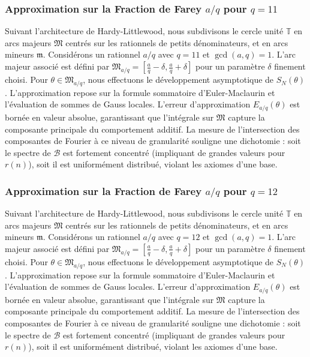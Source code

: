 \documentclass[11pt,a4paper]{article}
\begin{document}
\subsubsection{Approximation sur la Fraction de Farey $a/q$ pour $q=11$}
Suivant l'architecture de Hardy-Littlewood, nous subdivisons le cercle unité $\mathbb{T}$ en arcs majeurs $\mathfrak{M}$ centrés sur les rationnels de petits dénominateurs, et en arcs mineurs $\mathfrak{m}$.
Considérons un rationnel $a/q$ avec $q = 11$ et $\gcd(a,q)=1$. L'arc majeur associé est défini par $\mathfrak{M}_{a/q} = [\frac{a}{q} - \delta, \frac{a}{q} + \delta]$ pour un paramètre $\delta$ finement choisi.
Pour $\theta \in \mathfrak{M}_{a/q}$, nous effectuons le développement asymptotique de $S_N(\theta)$.
L'approximation repose sur la formule sommatoire d'Euler-Maclaurin et l'évaluation de sommes de Gauss locales.
L'erreur d'approximation $E_{a/q}(\theta)$ est bornée en valeur absolue, garantissant que l'intégrale sur $\mathfrak{M}$ capture la composante principale du comportement additif.
La mesure de l'intersection des composantes de Fourier à ce niveau de granularité souligne une dichotomie : soit le spectre de $\mathcal{B}$ est fortement concentré (impliquant de grandes valeurs pour $r(n)$), soit il est uniformément distribué, violant les axiomes d'une base.
\subsubsection{Approximation sur la Fraction de Farey $a/q$ pour $q=12$}
Suivant l'architecture de Hardy-Littlewood, nous subdivisons le cercle unité $\mathbb{T}$ en arcs majeurs $\mathfrak{M}$ centrés sur les rationnels de petits dénominateurs, et en arcs mineurs $\mathfrak{m}$.
Considérons un rationnel $a/q$ avec $q = 12$ et $\gcd(a,q)=1$. L'arc majeur associé est défini par $\mathfrak{M}_{a/q} = [\frac{a}{q} - \delta, \frac{a}{q} + \delta]$ pour un paramètre $\delta$ finement choisi.
Pour $\theta \in \mathfrak{M}_{a/q}$, nous effectuons le développement asymptotique de $S_N(\theta)$.
L'approximation repose sur la formule sommatoire d'Euler-Maclaurin et l'évaluation de sommes de Gauss locales.
L'erreur d'approximation $E_{a/q}(\theta)$ est bornée en valeur absolue, garantissant que l'intégrale sur $\mathfrak{M}$ capture la composante principale du comportement additif.
La mesure de l'intersection des composantes de Fourier à ce niveau de granularité souligne une dichotomie : soit le spectre de $\mathcal{B}$ est fortement concentré (impliquant de grandes valeurs pour $r(n)$), soit il est uniformément distribué, violant les axiomes d'une base.
\end{document}
